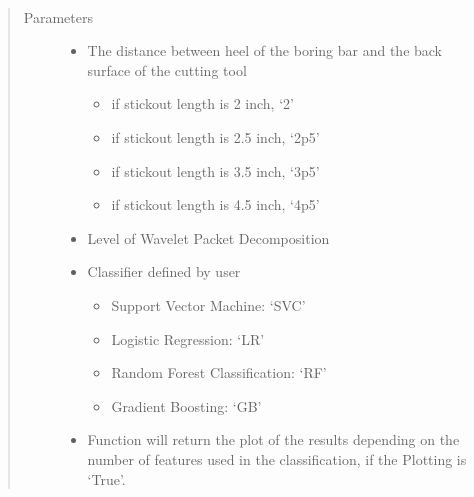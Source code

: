 \documentclass[letterpaper,10pt,english]{sphinxmanual}
\begin{document}
\begin{fulllineitems}
\label{\detokenize{WPT:WPT_Feature_Extraction.WPT_Feature_Extraction}}~\begin{quote}\begin{description}
\item[{Parameters}] \leavevmode\begin{itemize}
\item {} 
 \textendash{} 
The distance between heel of the boring bar and the back surface of the cutting tool
\begin{itemize}
\item {} 
if stickout length is 2 inch, ‘2’

\item {} 
if stickout length is 2.5 inch, ‘2p5’

\item {} 
if stickout length is 3.5 inch, ‘3p5’

\item {} 
if stickout length is 4.5 inch, ‘4p5’

\end{itemize}


\item {} 
 \textendash{} Level of Wavelet Packet Decomposition

\item {} 
 \textendash{} 
Classifier defined by user
\begin{itemize}
\item {} 
Support Vector Machine: ‘SVC’

\item {} 
Logistic Regression: ‘LR’

\item {} 
Random Forest Classification: ‘RF’

\item {} 
Gradient Boosting: ‘GB’

\end{itemize}


\item {} 
 \textendash{} Function will return the plot of the results depending on the number of features used in the classification, if the Plotting is ‘True’.


\end{itemize}
\end{description}
\end{quote}
\end{fulllineitems}
\end{document}
